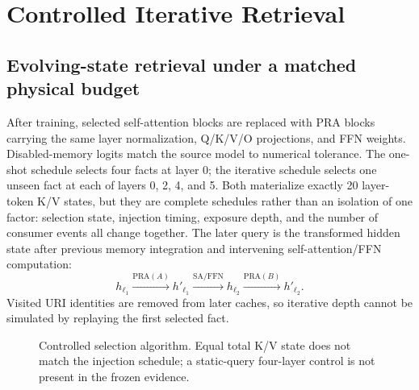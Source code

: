 \section{Controlled Iterative Retrieval}

\subsection{Evolving-state retrieval under a matched physical budget}

After training, selected self-attention blocks are replaced with PRA blocks carrying the same layer
normalization, Q/K/V/O projections, and FFN weights.  Disabled-memory logits match the source model
to numerical tolerance.  The one-shot schedule selects four facts at layer 0; the iterative schedule
selects one unseen fact at each of layers 0, 2, 4, and 5.  Both materialize exactly 20 layer-token K/V
states, but they are complete schedules rather than an isolation of one factor: selection state,
injection timing, exposure depth, and the number of consumer events all change together.
The later query is the transformed hidden state after previous memory integration and intervening
self-attention/FFN computation:
\begin{equation}
 h_{\ell_1}\xrightarrow{\mathrm{PRA}(A)}h'_{\ell_1}
 \xrightarrow{\mathrm{SA/FFN}}h_{\ell_2}
 \xrightarrow{\mathrm{PRA}(B)}h'_{\ell_2}.
\end{equation}
Visited URI identities are removed from later caches, so iterative depth cannot be simulated by
replaying the first selected fact.

\begin{figure}[H]
\centering
{}
\caption{Controlled selection algorithm.  Equal total K/V state does not match the injection schedule;
a static-query four-layer control is not present in the frozen evidence.}
\label{fig:controlled-selection-algorithm}
\end{figure}

